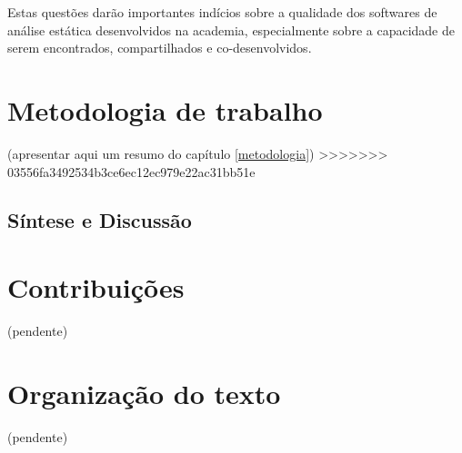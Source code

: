 Estas questões darão importantes indícios sobre a qualidade dos softwares de
análise estática desenvolvidos na academia, especialmente sobre a capacidade de
serem encontrados, compartilhados e co-desenvolvidos.

\section{Metodologia de trabalho}

(apresentar aqui um resumo do capítulo \ref{metodologia})
>>>>>>> 03556fa3492534b3ce6ec12ec979e22ac31bb51e

\subsection{Síntese e Discussão}


\section{Contribuições}

(pendente)

\section{Organização do texto}

(pendente)

%
%
%
%

